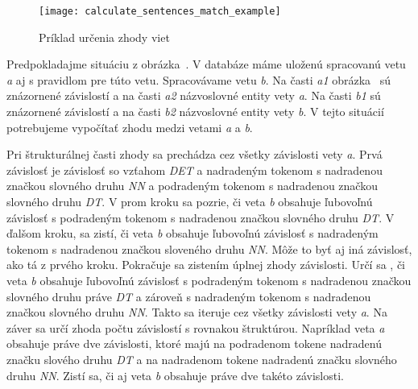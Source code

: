 \begin{figure}[H]
	\begin{center}\texttt{[image: calculate\_sentences\_match\_example]}\end{center}
	\caption[Príklad určenia zhody viet]{Príklad určenia zhody viet}\label{fig:calculate_match_sentences_example}
\end{figure}

Predpokladajme situáciu z obrázka~. V databáze máme uloženú spracovanú vetu \textit{a} aj s pravidlom pre túto vetu. Spracovávame vetu \textit{b}. Na časti \textit{a1} obrázka~ sú znázornené závislostí a na časti \textit{a2} názvoslovné entity vety \textit{a}. Na časti \textit{b1} sú znázornené závislostí a na časti \textit{b2} názvoslovné entity vety \textit{b}. V tejto situácií potrebujeme vypočítať zhodu medzi vetami \textit{a} a \textit{b}. 

Pri štrukturálnej časti zhody sa prechádza cez všetky závislosti vety \textit{a}. Prvá závislosť je závislosť so vzťahom \textit{DET} a nadradeným tokenom s nadradenou značkou slovného druhu \textit{NN} a podradeným tokenom s nadradenou značkou slovného druhu \textit{DT}. V prom kroku sa pozrie, či veta \textit{b} obsahuje ľubovoľnú závislosť s podradeným tokenom s nadradenou značkou slovného druhu \textit{DT}. V ďalšom kroku, sa zistí, či veta \textit{b} obsahuje ľubovoľnú závislosť s nadradeným tokenom s nadradenou značkou sloveného druhu \textit{NN}. Môže to byť aj iná závislosť, ako tá z prvého kroku. Pokračuje sa zistením úplnej zhody závislosti. Určí sa , či veta \textit{b} obsahuje ľubovoľnú závislosť s podradeným tokenom s nadradenou značkou slovného druhu práve \textit{DT} a zároveň s nadradeným tokenom s nadradenou značkou slovného druhu \textit{NN}. Takto sa iteruje cez všetky závislosti vety \textit{a}. Na záver sa určí zhoda počtu závislostí s rovnakou štruktúrou. Napríklad veta \textit{a} obsahuje práve dve závislosti, ktoré majú na podradenom tokene nadradenú značku slového druhu \textit{DT} a na nadradenom tokene nadradenú značku slovného druhu \textit{NN}. Zistí sa, či aj veta \textit{b} obsahuje práve dve takéto závislosti. \\


